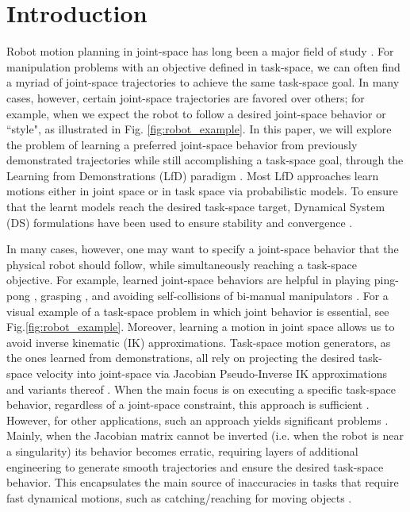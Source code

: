 \documentclass[letterpaper, 10 pt, conference,fleqn]{ieeeconf}
\begin{document}

\IEEEpeerreviewmaketitle
\vspace{-10pt}
\section{Introduction}
\label{sec:intro}
Robot motion planning in joint-space has long been a major field of study \cite{kelly2006control}. For manipulation problems with an objective defined in task-space, we can often find a myriad of joint-space trajectories to achieve the same task-space goal. In many cases, however, certain joint-space trajectories are favored over others; for example, when we expect the robot to follow a desired joint-space behavior or ``style", as illustrated in Fig. \ref{fig:robot_example}. In this paper, we will explore the problem of learning a preferred joint-space behavior from previously demonstrated trajectories while still accomplishing a task-space goal, through the Learning from Demonstrations (LfD) paradigm \cite{billard2008robot,Argall:RAS:2009}. Most LfD approaches learn motions either in joint space
\cite{Garrido:Neuro:2015,Schaal:AI:2002} or in task space
\cite{Pastor:ICRA:2009,Calinon:ISR:2015} via probabilistic models.
To ensure that the learnt models reach the desired task-space target, Dynamical System (DS) formulations have been used to ensure stability and  convergence \cite{khansari2011learning, Neumann:RAS:2015}.

In many cases, however, one may want to specify a joint-space behavior that the physical robot should follow, while simultaneously reaching a task-space objective. For example, learned joint-space behaviors are helpful in playing ping-pong \cite{huang2016jointly}, grasping \cite{calinon2010learning}, and avoiding self-collisions of bi-manual manipulators \cite{silverio2017learning}. For a visual example of a task-space problem in which joint behavior is essential, see Fig.\ref{fig:robot_example}. Moreover, learning a motion in joint space allows us to avoid inverse kinematic (IK) approximations. Task-space motion generators, as the ones learned from demonstrations, all rely on projecting the desired task-space velocity into joint-space via Jacobian Pseudo-Inverse IK approximations and variants thereof \cite{kelly2006control}. When the main focus is on executing a specific task-space behavior, regardless of a joint-space constraint, this approach is sufficient \cite{figueroa2016HRIrolling,ureche2015taskconst}. However, for other applications, such an approach yields significant problems \cite{buss2004introduction}. Mainly, when the Jacobian matrix cannot be inverted (i.e. when the robot is near a singularity) its behavior becomes erratic, requiring layers of additional engineering to generate smooth trajectories and ensure the desired task-space behavior. This encapsulates the main source of inaccuracies in tasks that require fast dynamical motions, such as catching/reaching for moving objects \cite{7439839,Salehian-RSS-16}. 
\end{document}
